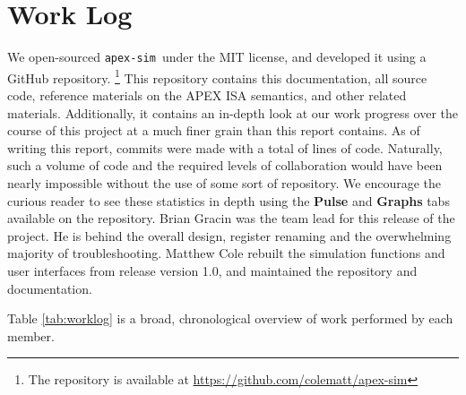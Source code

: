 \documentclass[12pt]{article}
\newcommand{\codename}[0]{\texttt{apex-sim}~}
\begin{document}
\section{Work Log}
\label{sec:worklog}
We open-sourced \codename under the MIT license, and developed it using a GitHub repository. \footnote{The repository is available at \url{https://github.com/colematt/apex-sim}}
This repository contains this documentation, all source code, reference materials on the APEX ISA semantics, and other related materials.
Additionally, it contains an in-depth look at our work progress over the course of this project at a much finer grain than this report contains.
As of writing this report,  commits were made with a total of  lines of code.
Naturally, such a volume of code and the required levels of collaboration would have been nearly impossible without the use of some sort of repository.
We encourage the curious reader to see these statistics in depth using the \textbf{Pulse} and \textbf{Graphs} tabs available on the repository.
Brian Gracin was the team lead for this release of the project. He is behind the overall design, register renaming and the overwhelming majority of troubleshooting.
Matthew Cole rebuilt the simulation functions and user interfaces from release version 1.0, and maintained the repository and documentation.


Table \ref{tab:worklog} is a broad, chronological overview of work performed by each member. 
\end{document}
